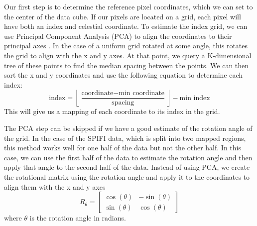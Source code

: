 Our first step is to determine the reference pixel coordinates, which we can set to the center of the data cube.
If our pixels are located on a grid, each pixel will have both an index and celestial coordinate.
To estimate the index grid, we can use Principal Component Analysis (PCA) to align the coordinates to their principal axes \parencite{wold1987principal}.
In the case of a uniform grid rotated at some angle, this rotates the grid to align with the x and y axes.
At that point, we query a K-dimensional tree of these points to find the median spacing between the points.
We can then sort the x and y coordinates and use the following equation to determine each index:
\begin{equation}
    \text{index} = \left\lfloor \frac{\text{coordinate} - \text{min coordinate}}{\text{spacing}} \right\rfloor - \text{min index}
    \label{carina/eq:index}
\end{equation}
This will give us a mapping of each coordinate to its index in the grid.

The PCA step can be skipped if we have a good estimate of the rotation angle of the grid.
In the case of the SPIFI data, which is split into two mapped regions, this method works well for one half of the data but not the other half.
In this case, we can use the first half of the data to estimate the rotation angle and then apply that angle to the second half of the data.
Instead of using PCA, we create the rotational matrix using the rotation angle and apply it to the coordinates to align them with the x and y axes 
\begin{equation}
    R_\theta = \begin{bmatrix}
        \cos(\theta) & -\sin(\theta) \\
        \sin(\theta) & \cos(\theta)
    \end{bmatrix}
\end{equation}
where $\theta$ is the rotation angle in radians.


